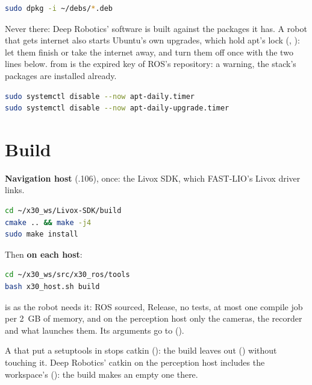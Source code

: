 \begin{lstlisting}[language=bash]
sudo dpkg -i ~/debs/*.deb
\end{lstlisting}

\begin{warnbox}
Never  there: Deep Robotics' software is built against the packages it has. A
robot that gets internet also starts Ubuntu's own upgrades, which hold apt's lock
(, ): let them finish or take the internet away,
and turn them off once with the two lines below.  from  is the
expired key of ROS's repository: a warning, the stack's packages are installed already.
\end{warnbox}

\begin{lstlisting}[language=bash]
sudo systemctl disable --now apt-daily.timer
sudo systemctl disable --now apt-daily-upgrade.timer
\end{lstlisting}

\section{Build}
\label{sec:i-build}

\textbf{Navigation host} (.106), once: the Livox SDK, which FAST-LIO's Livox driver links.

\begin{lstlisting}[language=bash]
cd ~/x30_ws/Livox-SDK/build
cmake .. && make -j4
sudo make install
\end{lstlisting}

Then \textbf{on each host}:

\begin{lstlisting}[language=bash]
cd ~/x30_ws/src/x30_ros/tools
bash x30_host.sh build
\end{lstlisting}

 is  as the robot needs it: ROS sourced, Release, no
tests, at most one compile job per 2~GB of memory, and on the perception host only the cameras,
the recorder and what launches them. Its arguments go to 
().

\begin{notebox}
A  that put a setuptools in  stops catkin
(): the build leaves
 out () without touching it. Deep Robotics' catkin on
the perception host includes the workspace's  (): the build makes an empty one there.
\end{notebox}

